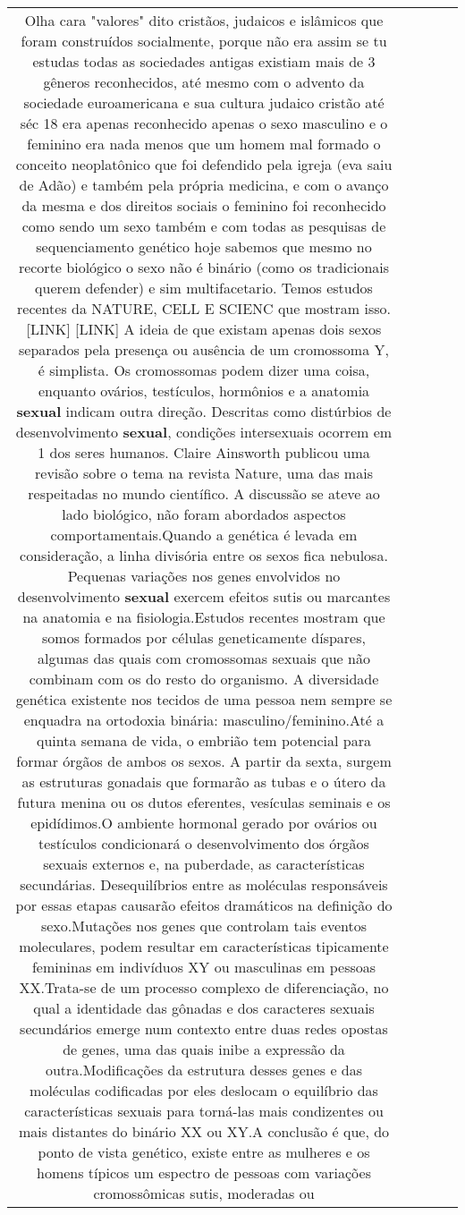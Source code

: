\documentclass[11pt]{article}
\newlength\mylength
\begin{document}
\begin{center}
\begin{longtable}{|C{.65\mylength}|C{.30\mylength}|C{.12\mylength}|C{.12\mylength}|C{.12\mylength}|}
  \small Olha cara "valores" dito cristãos, judaicos e islâmicos que foram construídos socialmente, porque não era assim se tu estudas todas as sociedades antigas existiam mais de 3 gêneros reconhecidos, até mesmo com o advento da sociedade euroamericana e sua cultura judaico cristão até séc 18 era apenas reconhecido apenas o sexo masculino e o feminino era nada menos que um homem mal formado o conceito neoplatônico que foi defendido pela igreja (eva saiu de Adão) e também pela própria medicina, e com o avanço da mesma e dos direitos sociais o feminino foi reconhecido como sendo um sexo também e com todas as pesquisas de sequenciamento genético hoje sabemos que mesmo no recorte biológico o sexo não é binário (como os tradicionais querem defender) e sim multifacetario. Temos estudos recentes da NATURE, CELL E SCIENC que mostram isso.   [LINK]   [LINK]  A ideia de que existam apenas dois sexos separados pela presença ou ausência de um cromossoma Y, é simplista. Os cromossomas podem dizer uma coisa, enquanto ovários, testículos, hormônios e a anatomia \textbf{sexual} indicam outra direção. Descritas como distúrbios de desenvolvimento \textbf{sexual}, condições intersexuais ocorrem em 1 dos seres humanos. Claire Ainsworth publicou uma revisão sobre o tema na revista Nature, uma das mais respeitadas no mundo científico. A discussão se ateve ao lado biológico, não foram abordados aspectos comportamentais.Quando a genética é levada em consideração, a linha divisória entre os sexos fica nebulosa. Pequenas variações nos genes envolvidos no desenvolvimento \textbf{sexual} exercem efeitos sutis ou marcantes na anatomia e na fisiologia.Estudos recentes mostram que somos formados por células geneticamente díspares, algumas das quais com cromossomas sexuais que não combinam com os do resto do organismo. A diversidade genética existente nos tecidos de uma pessoa nem sempre se enquadra na ortodoxia binária: masculino/feminino.Até a quinta semana de vida, o embrião tem potencial para formar órgãos de ambos os sexos. A partir da sexta, surgem as estruturas gonadais que formarão as tubas e o útero da futura menina ou os dutos eferentes, vesículas seminais e os epidídimos.O ambiente hormonal gerado por ovários ou testículos condicionará o desenvolvimento dos órgãos sexuais externos e, na puberdade, as características secundárias. Desequilíbrios entre as moléculas responsáveis por essas etapas causarão efeitos dramáticos na definição do sexo.Mutações nos genes que controlam tais eventos moleculares, podem resultar em características tipicamente femininas em indivíduos XY ou masculinas em pessoas XX.Trata-se de um processo complexo de diferenciação, no qual a identidade das gônadas e dos caracteres sexuais secundários emerge num contexto entre duas redes opostas de genes, uma das quais inibe a expressão da outra.Modificações da estrutura desses genes e das moléculas codificadas por eles deslocam o equilíbrio das características sexuais para torná-las mais condizentes ou mais distantes do binário XX ou XY.A conclusão é que, do ponto de vista genético, existe entre as mulheres e os homens típicos um espectro de pessoas com variações cromossômicas sutis, moderadas ou 
\end{longtable}
\end{center}
\end{document}
